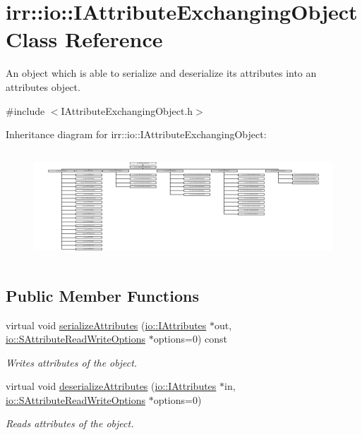 \hypertarget{classirr_1_1io_1_1IAttributeExchangingObject}{}\section{irr\+:\+:io\+:\+:I\+Attribute\+Exchanging\+Object Class Reference}
\label{classirr_1_1io_1_1IAttributeExchangingObject}


An object which is able to serialize and deserialize its attributes into an attributes object.  




{\ttfamily \#include $<$I\+Attribute\+Exchanging\+Object.\+h$>$}

Inheritance diagram for irr\+:\+:io\+:\+:I\+Attribute\+Exchanging\+Object\+:\begin{figure}[H]
\begin{center}
\leavevmode
\includegraphics[height=4.128205cm]{classirr_1_1io_1_1IAttributeExchangingObject}
\end{center}
\end{figure}
\subsection*{Public Member Functions}
\begin{DoxyCompactItemize}
\item 
virtual void \hyperlink{classirr_1_1io_1_1IAttributeExchangingObject_a587f7b633366968f0488e1099e9172ef}{serialize\+Attributes} (\hyperlink{classirr_1_1io_1_1IAttributes}{io\+::\+I\+Attributes} $\ast$out, \hyperlink{structirr_1_1io_1_1SAttributeReadWriteOptions}{io\+::\+S\+Attribute\+Read\+Write\+Options} $\ast$options=0) const
\begin{DoxyCompactList}\small\item\em Writes attributes of the object. \end{DoxyCompactList}\item 
virtual void \hyperlink{classirr_1_1io_1_1IAttributeExchangingObject_a013d4ead3736d7fab4bc18c2d61a3e2e}{deserialize\+Attributes} (\hyperlink{classirr_1_1io_1_1IAttributes}{io\+::\+I\+Attributes} $\ast$in, \hyperlink{structirr_1_1io_1_1SAttributeReadWriteOptions}{io\+::\+S\+Attribute\+Read\+Write\+Options} $\ast$options=0)
\begin{DoxyCompactList}\small\item\em Reads attributes of the object. \end{DoxyCompactList}\end{DoxyCompactItemize}
